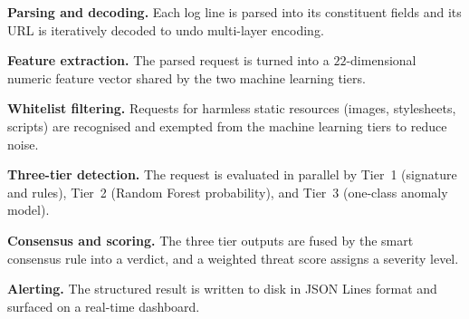 \documentclass[12pt,a4paper]{report}
\begin{document}
\begin{romanlist}
  \item \textbf{Parsing and decoding.} Each log line is parsed into its
        constituent fields and its URL is iteratively decoded to undo
        multi-layer encoding.
  \item \textbf{Feature extraction.} The parsed request is turned into a
        $22$-dimensional numeric feature vector shared by the two machine
        learning tiers.
  \item \textbf{Whitelist filtering.} Requests for harmless static
        resources (images, stylesheets, scripts) are recognised and exempted
        from the machine learning tiers to reduce noise.
  \item \textbf{Three-tier detection.} The request is evaluated in parallel
        by Tier~1 (signature and rules), Tier~2 (Random Forest probability),
        and Tier~3 (one-class anomaly model).
  \item \textbf{Consensus and scoring.} The three tier outputs are fused by
        the smart consensus rule into a verdict, and a weighted threat score
        assigns a severity level.
  \item \textbf{Alerting.} The structured result is written to disk in JSON
        Lines format and surfaced on a real-time dashboard.
\end{romanlist}
\end{document}
